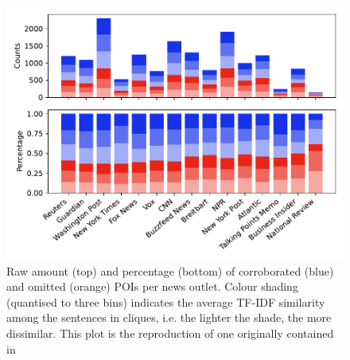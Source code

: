 \begin{figure}[!htbp]
    \centering
    \includegraphics[width=\linewidth]{figures/bountouridis_fig_3_noGA.pdf}
    \caption{Raw amount (top) and percentage (bottom) of corroborated (blue) and omitted (orange) POIs per news outlet. Colour shading (quantised to three bins) indicates the average TF-IDF similarity among the sentences in cliques, i.e. the lighter the shade, the more dissimilar. This plot is the reproduction of one originally contained in~\citet{bountouridis2018explaining}}
    \label{fig:figure_3_bountouridis_reproduced}
\end{figure}




